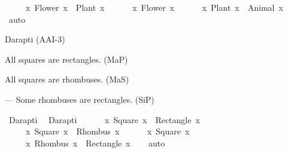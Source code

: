 \begin{isabellebody}
\begin{exercise}[subtitle=Silogizmi]
\ \ \ \ {\isacharparenleft}{\kern0pt}{\isasymforall}\ x{\isachardot}{\kern0pt}\ Flower\ x\ {\isasymlongrightarrow}\ Plant\ x{\isacharparenright}{\kern0pt}\ {\isasymand}\isanewline
\ \ \ \ {\isacharparenleft}{\kern0pt}{\isasymexists}\ x{\isachardot}{\kern0pt}\ Flower\ x{\isacharparenright}{\kern0pt}\ {\isasymlongrightarrow}\isanewline
\ \ \ \ {\isacharparenleft}{\kern0pt}{\isasymexists}\ x{\isachardot}{\kern0pt}\ Plant\ x\ {\isasymand}\ {\isasymnot}Animal\ x{\isacharparenright}{\kern0pt}{\isachardoublequoteclose}\isanewline
%
\isadelimproof
\ \ %
\endisadelimproof
%
\isatagproof
{}\isamarkupfalse%
\ auto%
\endisatagproof
{\isafoldproof}%
%
\isadelimproof
%
\endisadelimproof
%
\begin{isamarkuptext}%
Darapti (AAI-3)%
\end{isamarkuptext}\isamarkuptrue%
%
\begin{isamarkuptext}%
All squares are rectangles. (MaP)%
\end{isamarkuptext}\isamarkuptrue%
%
\begin{isamarkuptext}%
All squares are rhombuses. (MaS)%
\end{isamarkuptext}\isamarkuptrue%
%
\begin{isamarkuptext}%
— Some rhombuses are rectangles. (SiP)%
\end{isamarkuptext}\isamarkuptrue%
\isamarkupfalse%
\ Darapti{\isacharcolon}{\kern0pt}\ %
\isadelimproof
%
\endisadelimproof
%
\isatagproof
%
\endisatagproof
{\isafoldproof}%
%
\isadelimproof
\isanewline
%
\endisadelimproof
{}\isamarkupfalse%
\ Darapti{\isacharcolon}{\kern0pt}\ {\isachardoublequoteopen}\isanewline
\ \ \ \ {\isacharparenleft}{\kern0pt}{\isasymforall}\ x{\isachardot}{\kern0pt}\ Square\ x\ {\isasymlongrightarrow}\ Rectangle\ x{\isacharparenright}{\kern0pt}\ {\isasymand}\isanewline
\ \ \ \ {\isacharparenleft}{\kern0pt}{\isasymforall}\ x{\isachardot}{\kern0pt}\ Square\ x\ {\isasymlongrightarrow}\ Rhombus\ x{\isacharparenright}{\kern0pt}\ {\isasymand}\isanewline
\ \ \ \ {\isacharparenleft}{\kern0pt}{\isasymexists}\ x{\isachardot}{\kern0pt}\ Square\ x{\isacharparenright}{\kern0pt}\ {\isasymlongrightarrow}\isanewline
\ \ \ \ {\isacharparenleft}{\kern0pt}{\isasymexists}\ x{\isachardot}{\kern0pt}\ Rhombus\ x\ {\isasymand}\ Rectangle\ x{\isacharparenright}{\kern0pt}{\isachardoublequoteclose}\isanewline
%
\isadelimproof
\ \ %
\endisadelimproof
%
\isatagproof
{}\isamarkupfalse%
\ auto%
\endisatagproof
{\isafoldproof}%
%
\isadelimproof
%
\endisadelimproof
%
\end{exercise}

\end{isabellebody}
